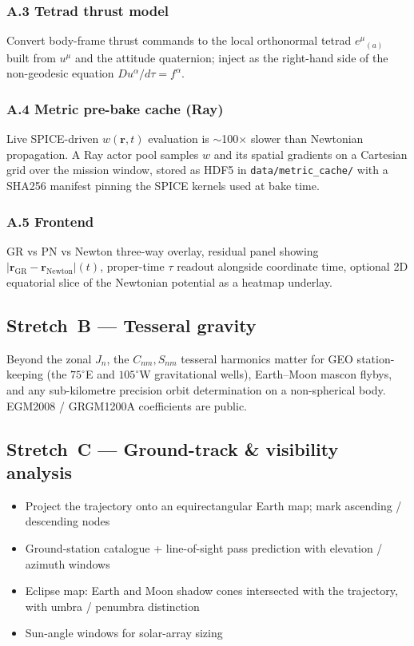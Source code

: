 \documentclass[11pt, a4paper]{article}
\begin{document}
\subsubsection{A.3 Tetrad thrust model}

Convert body-frame thrust commands to the local orthonormal tetrad
$e^\mu{}_{(a)}$ built from $u^\mu$ and the attitude quaternion; inject as
the right-hand side of the non-geodesic equation $Du^\alpha/d\tau = f^\alpha$.

\subsubsection{A.4 Metric pre-bake cache (Ray)}

Live SPICE-driven $w(\mathbf{r}, t)$ evaluation is $\sim$100$\times$ slower
than Newtonian propagation. A Ray actor pool samples $w$ and its spatial
gradients on a Cartesian grid over the mission window, stored as HDF5 in
\texttt{data/metric\_cache/} with a SHA256 manifest pinning the SPICE
kernels used at bake time.

\subsubsection{A.5 Frontend}

GR vs PN vs Newton three-way overlay, residual panel showing
$|\mathbf{r}_\text{GR} - \mathbf{r}_\text{Newton}|(t)$, proper-time $\tau$
readout alongside coordinate time, optional 2D equatorial slice of the
Newtonian potential as a heatmap underlay.

\subsection{Stretch~B --- Tesseral gravity}

Beyond the zonal $J_n$, the $C_{nm}, S_{nm}$ tesseral harmonics matter for
GEO station-keeping (the $75^\circ$E and $105^\circ$W gravitational wells),
Earth--Moon mascon flybys, and any sub-kilometre precision orbit
determination on a non-spherical body. EGM2008 / GRGM1200A coefficients
are public.

\subsection{Stretch~C --- Ground-track \& visibility analysis}

\begin{itemize}[leftmargin=*]
  \item Project the trajectory onto an equirectangular Earth map; mark
        ascending / descending nodes
  \item Ground-station catalogue + line-of-sight pass prediction with
        elevation / azimuth windows
  \item Eclipse map: Earth and Moon shadow cones intersected with the
        trajectory, with umbra / penumbra distinction
  \item Sun-angle windows for solar-array sizing
\end{itemize}
\end{document}
